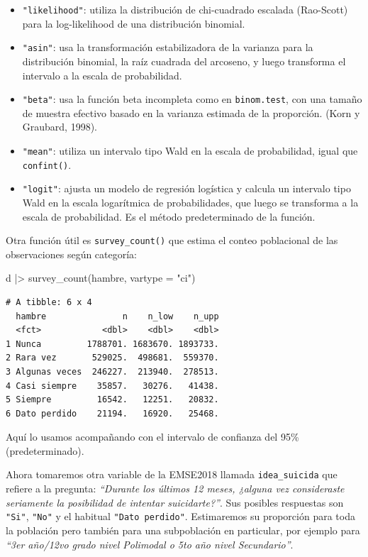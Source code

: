 \documentclass[
  spanish,
  a4paper,
]{scrbook}
\newenvironment{Shaded}{\begin{snugshade}}{\end{snugshade}}
\newcommand{\AttributeTok}[1]{\textcolor[rgb]{0.40,0.45,0.13}{#1}}
\newcommand{\FunctionTok}[1]{\textcolor[rgb]{0.28,0.35,0.67}{#1}}
\newcommand{\NormalTok}[1]{\textcolor[rgb]{0.00,0.23,0.31}{#1}}
\newcommand{\SpecialCharTok}[1]{\textcolor[rgb]{0.37,0.37,0.37}{#1}}
\newcommand{\StringTok}[1]{\textcolor[rgb]{0.13,0.47,0.30}{#1}}
\begin{document}
\begin{itemize}
\item
  \texttt{"likelihood"}: utiliza la distribución de chi-cuadrado
  escalada (Rao-Scott) para la log-likelihood de una distribución
  binomial.
\item
  \texttt{"asin"}: usa la transformación estabilizadora de la varianza
  para la distribución binomial, la raíz cuadrada del arcoseno, y luego
  transforma el intervalo a la escala de probabilidad.
\item
  \texttt{"beta"}: usa la función beta incompleta como en
  \texttt{binom.test}, con una tamaño de muestra efectivo basado en la
  varianza estimada de la proporción. (Korn y Graubard, 1998).
\item
  \texttt{"mean"}: utiliza un intervalo tipo Wald en la escala de
  probabilidad, igual que \texttt{confint()}.
\item
  \texttt{"logit"}: ajusta un modelo de regresión logística y calcula un
  intervalo tipo Wald en la escala logarítmica de probabilidades, que
  luego se transforma a la escala de probabilidad. Es el método
  predeterminado de la función.
\end{itemize}

Otra función útil es \texttt{survey\_count()} que estima el conteo
poblacional de las observaciones según categoría:

\begin{Shaded}
\begin{Highlighting}[]
\NormalTok{d }\SpecialCharTok{|\textgreater{}}
  \FunctionTok{survey\_count}\NormalTok{(hambre, }\AttributeTok{vartype =} \StringTok{"ci"}\NormalTok{)}
\end{Highlighting}
\end{Shaded}

\begin{verbatim}
# A tibble: 6 x 4
  hambre               n    n_low    n_upp
  <fct>            <dbl>    <dbl>    <dbl>
1 Nunca         1788701. 1683670. 1893733.
2 Rara vez       529025.  498681.  559370.
3 Algunas veces  246227.  213940.  278513.
4 Casi siempre    35857.   30276.   41438.
5 Siempre         16542.   12251.   20832.
6 Dato perdido    21194.   16920.   25468.
\end{verbatim}

Aquí lo usamos acompañando con el intervalo de confianza del 95\%
(predeterminado).

Ahora tomaremos otra variable de la EMSE2018 llamada
\texttt{idea\_suicida} que refiere a la pregunta: \emph{``Durante los
últimos 12 meses, ¿alguna vez consideraste seriamente la posibilidad de
intentar suicidarte?''}. Sus posibles respuestas son \texttt{"Si"},
\texttt{"No"} y el habitual \texttt{"Dato\ perdido"}. Estimaremos su
proporción para toda la población pero también para una subpoblación en
particular, por ejemplo para \emph{``3er año/12vo grado nivel Polimodal
o 5to año nivel Secundario''}.
\end{document}

